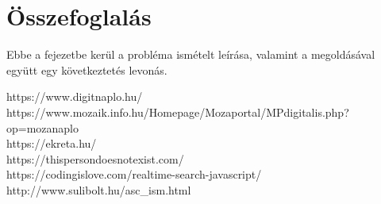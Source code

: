 \documentclass[
]{thesis-ekf}
\begin{document}
\chapter{Összefoglalás}
Ebbe a fejezetbe kerül a probléma ismételt leírása, valamint a megoldásával együtt egy következtetés levonás.
\begin{thebibliography}{}
	https://www.digitnaplo.hu/\\
	https://www.mozaik.info.hu/Homepage/Mozaportal/MPdigitalis.php?op=mozanaplo\\
	https://ekreta.hu/\\
	https://thispersondoesnotexist.com/ \\
	https://codingislove.com/realtime-search-javascript/\\
	http://www.sulibolt.hu/asc\_ism.html
\end{thebibliography}
\end{document}
